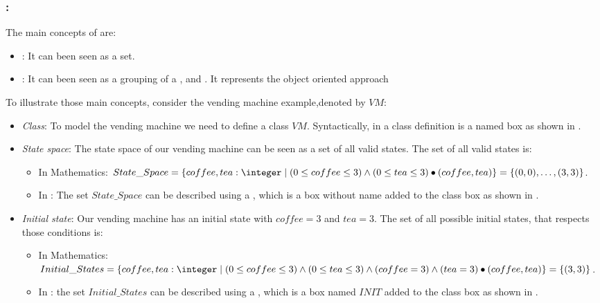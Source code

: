 \subsubsection{:} 
\label{main_concepts_oz} 
The main concepts of \oz{} are:
\begin{itemize}
\item {}: It can been seen as a set.
\item {}: It can been seen as a grouping of a  ,  and . It represents the object oriented approach 
\end{itemize}

To illustrate those main concepts, consider the vending machine example,denoted by $VM$:
\begin{itemize}
\item \textit{Class}: To model the vending machine we need to define a class $VM$. Syntactically, in \oz{}
a class definition is a named box as shown in .


\item \textit{State space}: The state space of our vending machine can be seen as a set of all valid states. The set of all valid states is:
\begin{itemize}
\item In Mathematics: $State\_Space=\{coffee,tea: \integer\mid (0 \leq  coffee \leq 3) \wedge
(0 \leq  tea \leq 3)\bullet(coffee,tea)\}  =\{\pair{0}{0},\dots,\pair{3}{3}\}$.
\item In \oz{}: The set $State\_Space$ can be described using a , which is a box without name added to the class box as shown in .
\end{itemize}


\item \textit{Initial state}: Our vending machine has an initial state with $coffee = 3$ and $tea = 3$. The set of all possible initial states, that respects those conditions is:  
\begin{itemize}
\item In Mathematics: $Initial\_States =\{coffee,tea: \integer\mid (0 \leq  coffee \leq 3) \wedge
(0 \leq  tea \leq 3)\wedge (coffee = 3) \wedge (tea = 3)\bullet(coffee,tea)\}  =\{\pair{3}{3}\}$.
\item In \oz{}: the set $Initial\_States$ can be described using a , which is a box named $INIT$ added to the class box  as shown in .
\end{itemize}



\end{itemize}
